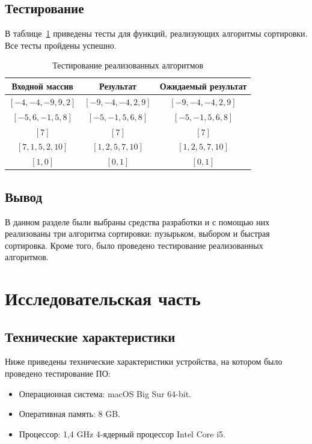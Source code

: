 \documentclass{report}
\begin{document}
\section{Тестирование}

В таблице~\ref{tbl:test} приведены тесты для функций, реализующих алгоритмы сортировки. Все тесты пройдены успешно.

\begin{table}[h!]
	\begin{center}
		\begin{tabular}{|c|c|c|}
			\hline
			Входной массив & Результат & Ожидаемый результат \\ 
			\hline
			$[-4, -4, -9, 9, 2]$ & $[-9, -4, -4, 2, 9]$  & $[-9, -4, -4, 2, 9]$\\\hline
			$[-5, 6, -1, 5, 8]$  & $[-5, -1, 5, 6, 8]$  & $[-5, -1, 5, 6, 8]$\\\hline
			$[7]$  & $[7]$  & $[7]$\\\hline
			$[7, 1, 5, 2, 10]$  & $[1, 2, 5, 7, 10]$  & $[1, 2, 5, 7, 10]$\\\hline
			$[1, 0]$  & $[0, 1]$  & $[0, 1]$\\\hline
		\end{tabular}
		\caption{\label{tbl:test}Тестирование реализованных алгоритмов}
	\end{center}
\end{table}

\section{Вывод}

В данном разделе были выбраны средства разработки и с помощью них реализованы три алгоритма сортировки: пузырьком, выбором и быстрая сортировка. Кроме того, было проведено тестирование реализованных алгоритмов.

\chapter{Исследовательская часть}

\section{Технические характеристики}

Ниже приведены технические характеристики устройства, на котором было проведено тестирование ПО:

\begin{itemize}
	\item Операционная система: macOS Big Sur 64-bit.
	\item Оперативная память: 8 GB.
	\item Процессор: 1,4 GHz 4‑ядерный процессор Intel Core i5.

\end{itemize}
\end{document}

